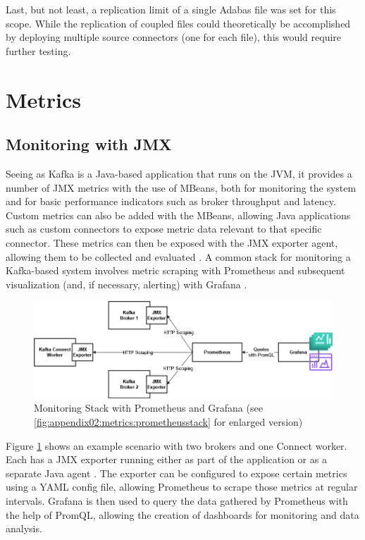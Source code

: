 Last, but not least, a replication limit of a single Adabas file was set for this scope. While the replication of coupled files could theoretically be accomplished by deploying multiple source connectors (one for each file), this would require further testing.

\section{Metrics}
\label{ch04:pipelinedevelopment:metrics}

\subsection{Monitoring with JMX}
Seeing as Kafka is a Java-based application that runs on the \ac{JVM}, it provides a number of \ac{JMX} metrics with the use of \ac{MBeans}, both for monitoring the system and for basic performance indicators such as broker throughput and latency. Custom metrics can also be added with the \ac{MBeans}, allowing Java applications such as custom connectors to expose metric data relevant to that specific connector. These metrics can then be exposed with the \ac{JMX} exporter agent, allowing them to be collected and evaluated \cite{kafkamonitoringgrafana}. A common stack for monitoring a Kafka-based system involves metric scraping with Prometheus and subsequent visualization (and, if necessary, alerting) with Grafana \cite{applicationmonitoringkafka}.

\begin{figure}[htbp]
 \centering
 \includegraphics[width=1\textwidth]{chapters/images/kafka prometheus monitoring stack enlarged.drawio.png}
 \caption[Monitoring Stack with Prometheus and Grafana]{Monitoring Stack with Prometheus and Grafana (see \ref{fig:appendix02:metrics:prometheusstack} for enlarged version)}
 \label{fig:chapter04:metrics:prometheusstack}
\end{figure}

Figure \ref{fig:chapter04:metrics:prometheusstack} shows an example scenario with two brokers and one Connect worker. Each has a \ac{JMX} exporter running either as part of the application or as a separate Java agent \cite{kafkamonitoringgrafana}. The exporter can be configured to expose certain metrics using a YAML config file, allowing Prometheus to scrape those metrics at regular intervals. Grafana is then used to query the data gathered by Prometheus with the help of \ac{PromQL}, allowing the creation of dashboards for monitoring and data analysis.

